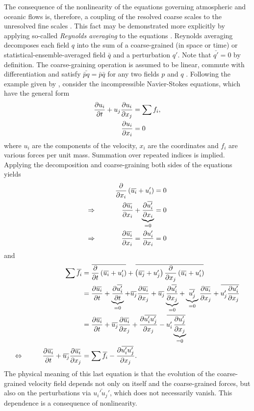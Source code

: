 \documentclass[../main.tex]{subfiles}
\begin{document}
The consequence of the nonlinearity of the equations governing atmospheric and
oceanic flows is, therefore, a coupling of the resolved coarse scales to the
unresolved fine scales \parencite{mcfarlane2011}.
This fact may be demonstrated more explicitly by applying so-called
\emph{Reynolds averaging} to the equations \parencite{christensen2022}.
Reynolds averaging decomposes each field $q$ into the sum of a coarse-grained
(in space or time) or statistical-ensemble-averaged field $\bar{q}$ and a
perturbation $q'$. Note that $\bar{q'} = 0$ by definition. The coarse-graining
operation is assumed to be linear, commute with differentiation and satisfy
$\bar{\bar{p} q} = \bar{p} \bar{q}$ for any two fields $p$ and $q$
\parencite{monin2007}. Following the example given by
\textcite{christensen2022}, consider the incompressible Navier-Stokes
equations, which have the general form
\begin{align*}
    \frac{\partial u_i}{\partial t} + u_j \frac{\partial u_i}{\partial x_j} &= \sum f_i, \\
    \frac{\partial u_i}{\partial x_i} &= 0
\end{align*}
where $u_i$ are the components of the velocity, $x_i$ are the
coordinates and $f_i$ are various forces per unit mass. Summation over repeated
indices is implied. Applying the decomposition and coarse-graining both sides
of the equations yields
\begin{alignat*}{2}
    && \pdiff{}{x_i} \left( \bar{u_i} + u_i' \right) &= 0 \\
    \Rightarrow & \qquad &
        \pdiff{\bar{u_i}}{x_i}
        + \underbrace{\pdiff{\bar{u_i'}}{x_i}}_{=0} &= 0 \\
    \Rightarrow & \qquad &
        \pdiff{\bar{u_i}}{x_i} = \pdiff{u_i'}{x_i} &= 0
\end{alignat*}
and
\begin{alignat*}{2}
    && \sum \bar{f_i} &=
        \bar{\pdiff{}{t} \left( \bar{u_i} + u_i' \right)}
        + \bar{\left( \bar{u_j} + u_j' \right)
        \pdiff{}{x_j} \left( \bar{u_i} + u_i' \right)} \\
    &&&=
        \pdiff{\bar{u_i}}{t}
        + \underbrace{\pdiff{\bar{u_i'}}{t}}_{=0}
        + \bar{u_j} \pdiff{\bar{u_i}}{x_j}
        + \bar{u_j} \underbrace{\pdiff{\bar{u_i'}}{x_j}}_{=0}
        + \underbrace{\bar{u_j'}}_{=0} \pdiff{\bar{u_i}}{x_j}
        + \bar{u_j' \pdiff{u_i'}{x_j}} \\
    &&&=
        \pdiff{\bar{u_i}}{t} + \bar{u_j} \pdiff{\bar{u_i}}{x_j}
        + \pdiff{\bar{u_i' u_j'}}{x_j}
        - \bar{u_i' \underbrace{\pdiff{u_j'}{x_j}}_{=0}} \\
    \Leftrightarrow & \qquad &
        \pdiff{\bar{u_i}}{t} + \bar{u_j} \pdiff{\bar{u_i}}{x_j}
        &= \sum \bar{f_i} - \pdiff{\bar{u_i' u_j'}}{x_j}.
\end{alignat*}
The physical meaning of this last equation is that the evolution of the
coarse-grained velocity field depends not only on itself and the coarse-grained
forces, but also on the perturbations via $\bar{u_i' u_j'}$, which does not
necessarily vanish. This dependence is a consequence of nonlinearity.
\end{document}
